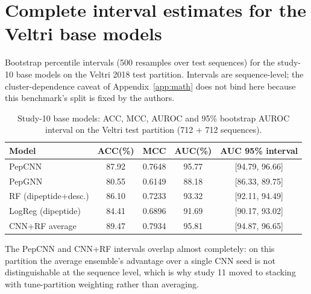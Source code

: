 
\section{Complete interval estimates for the Veltri base models}\label{app:ci}
Bootstrap percentile intervals (500 resamples over test sequences) for the
study-10 base models on the Veltri 2018 test partition. Intervals are
sequence-level; the cluster-dependence caveat of Appendix~\ref{app:math}
does not bind here because this benchmark's split is fixed by the authors.

\begin{table}[h]\centering\small
\caption{Study-10 base models: ACC, MCC, AUROC and 95\% bootstrap AUROC
interval on the Veltri test partition (712 + 712 sequences).}
\label{tab:ci}
\begin{tabular}{lcccc}
\hline
Model & ACC(\%) & MCC & AUC(\%) & AUC 95\% interval \\
\hline
PepCNN & 87.92 & 0.7648 & 95.77 & [94.79, 96.66] \\
PepGNN & 80.55 & 0.6149 & 88.18 & [86.33, 89.75] \\
RF (dipeptide+desc.) & 86.10 & 0.7233 & 93.32 & [92.11, 94.49] \\
LogReg (dipeptide) & 84.41 & 0.6896 & 91.69 & [90.17, 93.02] \\
CNN+RF average & 89.47 & 0.7934 & 95.81 & [94.87, 96.65] \\
\hline
\end{tabular}
\end{table}

The PepCNN and CNN+RF intervals overlap almost completely: on this
partition the average ensemble's advantage over a single CNN seed is not
distinguishable at the sequence level, which is why study 11 moved to
stacking with tune-partition weighting rather than averaging.
